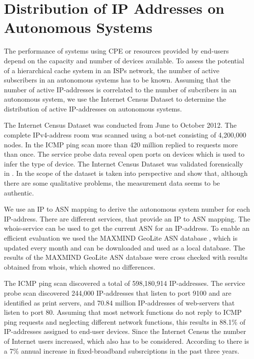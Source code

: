 \section{Distribution of IP Addresses on Autonomous Systems}\label{sec:census}

The performance of systems using CPE or resources provided by end-users depend on the capacity and number of devices available.
To assess the potential of a hierarchical cache system in an ISPs network, the number of active subscribers in an autonomous systems has to be known.
Assuming that the number of active IP-addresses is correlated to the number of subcribers in an autonomous system, we use the Internet Census Dataset to determine the distribution of active IP-addresses on autonomous systems.

The Internet Census Dataset\cite{carna2013} was conducted from June to October 2012.
The complete IPv4-address room was scanned using a bot-net consisting of 4,200,000 nodes.
In the ICMP ping scan more than 420 million replied to requests more than once.
The service probe data reveal open ports on devices which is used to infer the type of device.
The Internet Census Dataset was validated forensically in \cite{dainotticaida}.
In \cite{krenc2014internet} the scope of the dataset is taken into perspective and show that, although there are some qualitative problems, the measurement data seems to be authentic.

We use an IP to ASN mapping to derive the autonomous system number for each IP-address. There are different services, that provide an IP to ASN mapping.
The whois-service can be used to get the current ASN for an IP-address.
To enable an efficient evaluation we used the MAXMIND GeoLite ASN database \cite{geo_ip}, which is updated every month and can be downloaded and used as a local database.
The results of the MAXMIND GeoLite ASN database were cross checked with results obtained from whois, which showed no differences.

The ICMP ping scan discovered a total of 598,180,914 IP-addresses.
The service probe scan discovered 244,000 IP-addresses that listen to port 9100 and are identified as print servers, and 70.84 million IP-addresses of web-servers that listen to port 80.
Assuming that most network functions do not reply to ICMP ping requests and neglecting different network functions, this results in 88.1\% of IP-addresses assigned to end-user devices.
Since the Internet Census the number of Internet users increased, which also has to be considered.
According to \cite{itu2015facts} there is a 7\% annual increase in fixed-broadband subsrciptions in the past three years.

